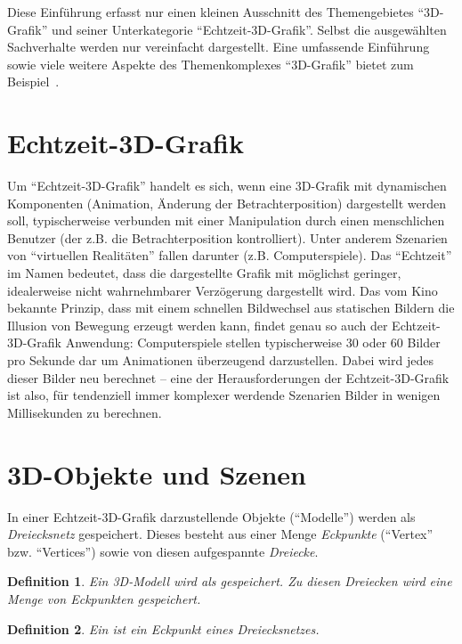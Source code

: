 \documentclass[twoside,a4paper,fleqn,12pt]{book}
\newtheorem{defn}{Definition}
\begin{document}
Diese Einführung erfasst nur einen kleinen Ausschnitt des Themengebietes "`3D-Grafik"' und seiner Unterkategorie
"`Echtzeit-3D-Grafik"'. Selbst die ausgewählten Sachverhalte werden nur vereinfacht dargestellt.
Eine umfassende Einführung sowie viele weitere Aspekte des Themenkomplexes "`3D-Grafik"' bietet zum Beispiel~\cite{watt_de}.

\section{Echtzeit-3D-Grafik}

Um "`Echtzeit-3D-Grafik"' handelt es sich, wenn eine 3D-Grafik mit dynamischen Komponenten (Animation, Änderung der Betrachterposition)
dargestellt werden soll, typischerweise verbunden mit einer Manipulation durch einen menschlichen Benutzer
(der z.B. die Betrachterposition kontrolliert). Unter anderem Szenarien von "`virtuellen Realitäten"' fallen darunter (z.B. Computerspiele).
Das "`Echtzeit"' im Namen bedeutet, dass die dargestellte Grafik mit möglichst geringer, idealerweise nicht wahrnehmbarer
Verzögerung dargestellt wird. Das vom Kino bekannte Prinzip, dass mit einem schnellen Bildwechsel aus statischen Bildern die Illusion von Bewegung
erzeugt werden kann, findet genau so auch der Echtzeit-3D-Grafik Anwendung: Computerspiele stellen typischerweise 30 oder 60 Bilder
pro Sekunde dar um Animationen überzeugend darzustellen. Dabei wird jedes dieser Bilder neu berechnet --
eine der Herausforderungen der Echtzeit-3D-Grafik ist also, für tendenziell immer komplexer werdende Szenarien Bilder in wenigen
Millisekunden zu berechnen.

\section{3D-Objekte und Szenen}
\label{objects}

In einer Echtzeit-3D-Grafik darzustellende Objekte ("`Modelle"') werden als \emph{Dreiecksnetz} gespeichert.
Dieses besteht aus einer Menge \emph{Eckpunkte} (``Vertex'' bzw. ``Vertices'')
sowie von diesen aufgespannte \emph{Dreiecke}.

\begin{defn}
Ein \emph{3D-Modell} wird als  gespeichert.
Zu diesen Dreiecken wird eine Menge von \emph{Eckpunkten} gespeichert.
\end{defn}

\begin{defn}
Ein  ist ein Eckpunkt eines Dreiecksnetzes.
\end{defn}
\end{document}
